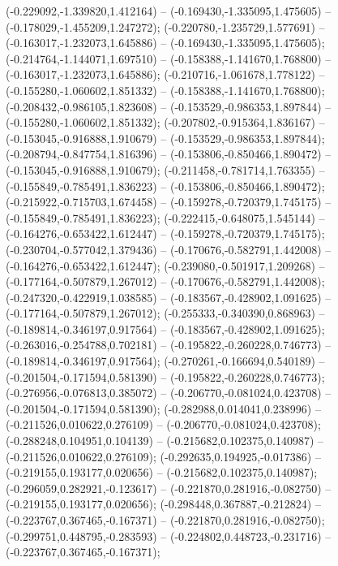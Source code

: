  (-0.229092,-1.339820,1.412164) -- (-0.169430,-1.335095,1.475605) -- (-0.178029,-1.455209,1.247272);
 (-0.220780,-1.235729,1.577691) -- (-0.163017,-1.232073,1.645886) -- (-0.169430,-1.335095,1.475605);
 (-0.214764,-1.144071,1.697510) -- (-0.158388,-1.141670,1.768800) -- (-0.163017,-1.232073,1.645886);
 (-0.210716,-1.061678,1.778122) -- (-0.155280,-1.060602,1.851332) -- (-0.158388,-1.141670,1.768800);
 (-0.208432,-0.986105,1.823608) -- (-0.153529,-0.986353,1.897844) -- (-0.155280,-1.060602,1.851332);
 (-0.207802,-0.915364,1.836167) -- (-0.153045,-0.916888,1.910679) -- (-0.153529,-0.986353,1.897844);
 (-0.208794,-0.847754,1.816396) -- (-0.153806,-0.850466,1.890472) -- (-0.153045,-0.916888,1.910679);
 (-0.211458,-0.781714,1.763355) -- (-0.155849,-0.785491,1.836223) -- (-0.153806,-0.850466,1.890472);
 (-0.215922,-0.715703,1.674458) -- (-0.159278,-0.720379,1.745175) -- (-0.155849,-0.785491,1.836223);
 (-0.222415,-0.648075,1.545144) -- (-0.164276,-0.653422,1.612447) -- (-0.159278,-0.720379,1.745175);
 (-0.230704,-0.577042,1.379436) -- (-0.170676,-0.582791,1.442008) -- (-0.164276,-0.653422,1.612447);
 (-0.239080,-0.501917,1.209268) -- (-0.177164,-0.507879,1.267012) -- (-0.170676,-0.582791,1.442008);
 (-0.247320,-0.422919,1.038585) -- (-0.183567,-0.428902,1.091625) -- (-0.177164,-0.507879,1.267012);
 (-0.255333,-0.340390,0.868963) -- (-0.189814,-0.346197,0.917564) -- (-0.183567,-0.428902,1.091625);
 (-0.263016,-0.254788,0.702181) -- (-0.195822,-0.260228,0.746773) -- (-0.189814,-0.346197,0.917564);
 (-0.270261,-0.166694,0.540189) -- (-0.201504,-0.171594,0.581390) -- (-0.195822,-0.260228,0.746773);
 (-0.276956,-0.076813,0.385072) -- (-0.206770,-0.081024,0.423708) -- (-0.201504,-0.171594,0.581390);
 (-0.282988,0.014041,0.238996) -- (-0.211526,0.010622,0.276109) -- (-0.206770,-0.081024,0.423708);
 (-0.288248,0.104951,0.104139) -- (-0.215682,0.102375,0.140987) -- (-0.211526,0.010622,0.276109);
 (-0.292635,0.194925,-0.017386) -- (-0.219155,0.193177,0.020656) -- (-0.215682,0.102375,0.140987);
 (-0.296059,0.282921,-0.123617) -- (-0.221870,0.281916,-0.082750) -- (-0.219155,0.193177,0.020656);
 (-0.298448,0.367887,-0.212824) -- (-0.223767,0.367465,-0.167371) -- (-0.221870,0.281916,-0.082750);
 (-0.299751,0.448795,-0.283593) -- (-0.224802,0.448723,-0.231716) -- (-0.223767,0.367465,-0.167371);
